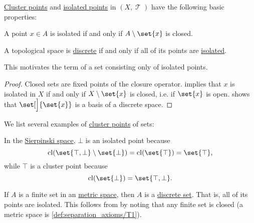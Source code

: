 \begin{proposition}\label{thm:def:cluster_point}
  \hyperref[def:cluster_point]{Cluster points} and \hyperref[def:cluster_point]{isolated points} in \( (X, \mscrT) \) have the following basic properties:
  \begin{thmenum}
     A point \( x \in A \) is isolated if and only if \( A \setminus \set{ x } \) is closed.

     A topological space is \hyperref[def:discrete_topology]{discrete} if and only if all of its points are \hyperref[def:cluster_point]{isolated}.

    This motivates the term  of a set consisting only of isolated points.
  \end{thmenum}
\end{proposition}
\begin{proof}
   Closed sets are fixed points of the closure operator.
    implies that \( x \) is isolated in \( X \) if and only if \( X \setminus \set{ x } \) is closed, i.e. if \( \set{ x } \) is open.  shows that \( \set[\Big]{ \set{ x } } \) is a basis of a discrete space.
\end{proof}

\begin{example}\label{ex:def:cluster_point}
  We list several examples of \hyperref[def:cluster_point]{cluster points} of sets:
  \begin{thmenum}
     In the \hyperref[def:sierpinski_space]{Sierpinski space}, \( \bot \) is an isolated point because
    \begin{equation*}
      \cl(\set{ \top, \bot } \setminus \set{ \bot }) = \cl(\set{ \top }) = \set{ \top },
    \end{equation*}
    while \( \top \) is a cluster point because
    \begin{equation*}
      \cl(\set{ \bot }) = \set{ \top, \bot }.
    \end{equation*}

     If \( A \) is a finite set in an \hyperref[def:metric_space]{metric space}, then \( A \) is a \hyperref[thm:def:cluster_point/discrete]{discrete set}. That is, all of its points are isolated. This follows from  by noting that any finite set is closed (a metric space is \ref{def:separation_axioms/T1}).
  \end{thmenum}
\end{example}

